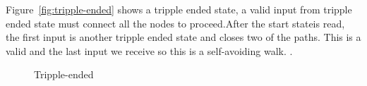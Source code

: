 Figure~\ref{fig:tripple-ended} shows a tripple ended state, a valid input from tripple ended state must connect all the nodes to proceed.After the start stateis read, the first input is another tripple ended state and closes two of the paths. This is a valid and the last input we receive so this is a self-avoiding walk. . 
\begin{figure}
\begin{center}
\end{center}
\caption{Tripple-ended}
\label{tripple-ended}
\end{figure}
